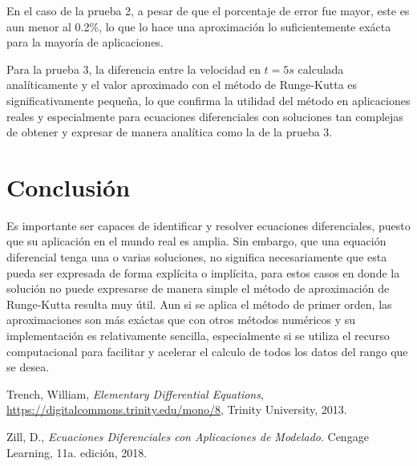 \documentclass[article, 11pt]{IEEEtran}   %
\begin{document}
En el caso de la prueba 2, a pesar de que el porcentaje de error fue mayor, este es aun menor al 0.2\%, lo que lo hace una aproximación lo suficientemente exácta para la mayoría de aplicaciones.
\vspace{1em}

Para la prueba 3, la diferencia entre la velocidad en $t=5s$ calculada analíticamente y el valor aproximado con el método de Runge-Kutta es significativamente pequeña, lo que confirma la utilidad del método en aplicaciones reales y especialmente para ecuaciones diferenciales con soluciones tan complejas de obtener y expresar de manera analítica como la de la prueba 3.

\section{Conclusi\'on}
Es importante ser capaces de identificar y resolver ecuaciones diferenciales, puesto que su aplicación en el mundo real es amplia. Sin embargo, que una equación diferencial tenga una o varias soluciones, no significa necesariamente que esta pueda ser expresada de forma explícita o implícita, para estos casos en donde la solución no puede expresarse de manera simple el método de aproximación de Runge-Kutta resulta muy útil. Aun si se aplica el método de primer orden, las aproximaciones son más exáctas que con otros métodos numéricos y su implementación es relativamente sencilla, especialmente si se utiliza el recurso computacional para facilitar y acelerar el calculo de todos los datos del rango que se desea.

\begin{thebibliography}{1}

Trench, William, \emph{Elementary Differential Equations}, \url{https://digitalcommons.trinity.edu/mono/8}, Trinity University, 2013.

Zill, D., \emph{Ecuaciones Diferenciales con Aplicaciones de Modelado}. Cengage Learning, 11a. edición, 2018.

\end{thebibliography}
\end{document}
